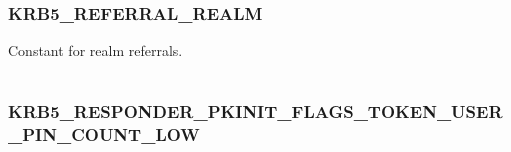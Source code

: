 \documentclass[letterpaper,10pt,english]{sphinxmanual}
\begin{document}
\begin{tabulary}{\linewidth}{|L|L|}
\hline

 & 
\\\hline
\end{tabulary}



\subsubsection{KRB5\_REFERRAL\_REALM}
\label{appdev/refs/macros/KRB5_REFERRAL_REALM:krb5-referral-realm-data}\label{appdev/refs/macros/KRB5_REFERRAL_REALM::doc}\label{appdev/refs/macros/KRB5_REFERRAL_REALM:krb5-referral-realm}

\begin{fulllineitems}
\label{appdev/refs/macros/KRB5_REFERRAL_REALM:KRB5_REFERRAL_REALM}
\end{fulllineitems}


Constant for realm referrals.

\begin{tabulary}{\linewidth}{|L|L|}
\hline

 & 
\\\hline
\end{tabulary}



\subsubsection{KRB5\_RESPONDER\_PKINIT\_FLAGS\_TOKEN\_USER\_PIN\_COUNT\_LOW}
\label{appdev/refs/macros/KRB5_RESPONDER_PKINIT_FLAGS_TOKEN_USER_PIN_COUNT_LOW:krb5-responder-pkinit-flags-token-user-pin-count-low-data}\label{appdev/refs/macros/KRB5_RESPONDER_PKINIT_FLAGS_TOKEN_USER_PIN_COUNT_LOW::doc}\label{appdev/refs/macros/KRB5_RESPONDER_PKINIT_FLAGS_TOKEN_USER_PIN_COUNT_LOW:krb5-responder-pkinit-flags-token-user-pin-count-low}

\begin{fulllineitems}
\label{appdev/refs/macros/KRB5_RESPONDER_PKINIT_FLAGS_TOKEN_USER_PIN_COUNT_LOW:KRB5_RESPONDER_PKINIT_FLAGS_TOKEN_USER_PIN_COUNT_LOW}
\end{fulllineitems}
\end{document}
